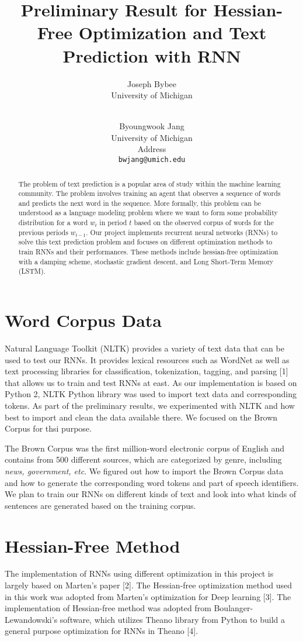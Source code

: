 \documentclass{article} %
\title{Preliminary Result for Hessian-Free Optimization and Text Prediction with RNN}
\author{
Joseph Bybee\\
University of Michigan\\
\texttt{} \\
\and
Byoungwook Jang\\
University of Michigan \\
Address \\
\texttt{bwjang@umich.edu} \\
}
\begin{document}
\maketitle

\begin{abstract}
The problem of text prediction is a popular area of study within the machine learning community. The problem involves training an agent that observes a sequence of words and predicts the next word in the sequence. More formally, this problem can be understood as a language modeling problem where we want to form some probability distribution for a word $w_t$ in period $t$ based on the observed corpus of words for the previous periods $w_{t-1}$. Our project implements recurrent neural networks (RNNs) to solve this text prediction problem and focuses on different optimization methods to train RNNs and their performances. These methods include hessian-free optimization with a damping scheme, stochastic gradient descent, and Long Short-Term Memory (LSTM). 
\end{abstract}

\section{Word Corpus Data}
Natural Language Toolkit (NLTK) provides a variety of text data that can be used to test our RNNs. It provides lexical resources such as WordNet as well as text processing libraries for classification, tokenization, tagging, and parsing [1] that allows us to train and test RNNs at east. As our implementation is based on Python 2, NLTK Python library was used to import text data and corresponding tokens. As part of the preliminary results, we experimented with NLTK and how best to import and clean the data available there.  We focused on the Brown Corpus for thsi purpose.

The Brown Corpus was the first million-word electronic corpus of English and contains from 500 different sources, which are categorized by genre, including \textit{news, government, etc}. We figured out how to import the Brown Corpus data and how to generate the corresponding word tokens and part of speech identifiers.  We plan to train our RNNs on different kinds of text and look into what kinds of sentences are generated based on the training corpus.

\section{Hessian-Free Method}
The implementation of RNNs using different optimization in this project is largely based on Marten's paper [2]. The Hessian-free optimization method used in this work was adopted from Marten's optimization for Deep learning [3]. The implementation of Hessian-free method was adopted from Boulanger-Lewandowski's software, which utilizes Theano library from Python to build a general purpose optimization for RNNs in Theano [4]. 
\end{document}
